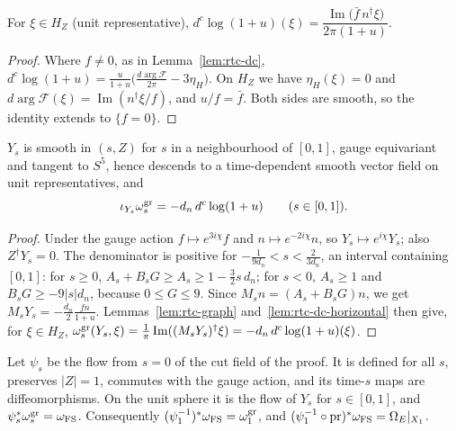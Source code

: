 \begin{lemma}\label{lem:rtc-dc-horizontal}
For $\xi\in H_Z$ (unit representative), $d^c\log(1+u)(\xi)=\dfrac{\operatorname{Im}\big(\bar f\,n^\dagger\xi\big)}{2\pi(1+u)}$.
\end{lemma}

\begin{proof}
Where $f\ne0$, as in Lemma~\ref{lem:rtc-dc}, $d^c\log(1+u)=\tfrac{u}{1+u}\big(\tfrac{d\arg\mathcal F}{2\pi}-3\eta_H\big)$. On $H_Z$ we have $\eta_H(\xi)=0$ and $d\arg\mathcal F(\xi)=\operatorname{Im}(n^\dagger\xi/f)$, and $u/f=\bar f$. Both sides are smooth, so the identity extends to $\{f=0\}$.
\end{proof}

\begin{lemma}\label{lem:rtc-return-field}
$Y_s$ is smooth in $(s,Z)$ for $s$ in a neighbourhood of $[0,1]$, gauge equivariant and tangent to $S^5$, hence descends to a
time-dependent smooth vector field on unit representatives, and
\[
 \iota_{Y_s}\omega^{\rm gr}_s=-d_n\,d^c\log(1+u)\qquad(s\in[0,1]).
\]
\end{lemma}

\begin{proof}
Under the gauge action $f\mapsto e^{3i\chi}f$ and $n\mapsto e^{-2i\chi}n$, so $Y_s\mapsto e^{i\chi}Y_s$; also $Z^\dagger Y_s=0$. The denominator is positive for $-\frac1{9d_n}<s<\frac2{3d_n}$, an interval containing $[0,1]$: for $s\ge0$, $A_s+B_sG\ge A_s\ge1-\frac32s\,d_n$; for $s<0$, $A_s\ge1$ and $B_sG\ge-9|s|d_n$, because $0\le G\le9$. Since $M_sn=(A_s+B_sG)n$, we get $M_sY_s=-\frac{d_n}2\frac{fn}{1+u}$. Lemmas~\ref{lem:rtc-graph} and~\ref{lem:rtc-dc-horizontal} then give, for $\xi\in H_Z$, $\omega^{\rm gr}_s(Y_s,\xi)=\frac1\pi\operatorname{Im}((M_sY_s)^\dagger\xi)=-d_n\,d^c\log(1+u)(\xi)$.
\end{proof}

\begin{proposition}\label{prop:rtc-return}
Let $\psi_s$ be the flow from $s=0$ of the cut field of the proof. It is defined for all $s$, preserves $|Z|=1$, commutes
with the gauge action, and its time-$s$ maps are diffeomorphisms. On the unit sphere it is the flow of $Y_s$ for
$s\in[0,1]$, and $\psi_s^*\omega_s^{\rm gr}=\omega_{\rm FS}$. Consequently $(\psi_1^{-1})^*\omega_{\rm FS}=\omega^{\rm gr}_1$, and
$(\psi_1^{-1}\circ\mathrm{pr})^*\omega_{\rm FS}=\Omega_E|_{X_1}$.
\end{proposition}

